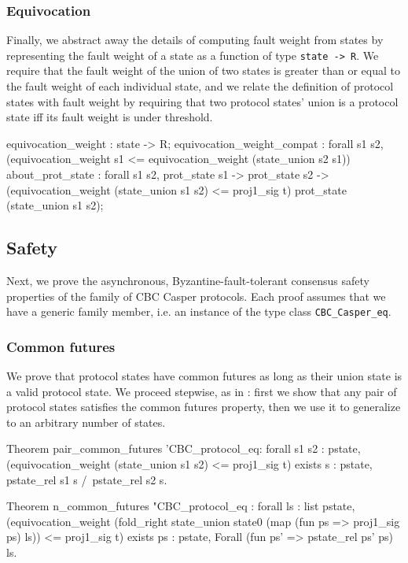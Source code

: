 \documentclass[runningheads]{llncs}
\begin{document}
\subsubsection{Equivocation} 
Finally, we abstract away the details of computing fault weight from states by representing the fault weight of a state as a function of type \verb|state -> R|. We require that the fault weight of the union of two states is greater than or equal to the fault weight of each individual state, and we relate the definition of protocol states with fault weight by requiring that two protocol states' union is a protocol state iff its fault weight is under threshold. 
\begin{coq}
	equivocation_weight : state -> R; 
	equivocation_weight_compat : forall s1 s2, 
	 (equivocation_weight s1 <= 
	 equivocation_weight (state_union s2 s1))%
	about_prot_state : forall s1 s2, 
									prot_state s1 -> prot_state s2 ->
									(equivocation_weight (state_union s1 s2) 
									<= proj1_sig t)%
									prot_state (state_union s1 s2);
\end{coq}

\subsection{Safety} 
Next, we prove the asynchronous, Byzantine-fault-tolerant consensus safety properties of the family of CBC Casper protocols. Each proof assumes that we have a generic family member, i.e. an instance of the type class \verb|CBC_Casper_eq|. 
\subsubsection{Common futures} 
We prove that protocol states have common futures as long as their union state is a valid protocol state. We proceed stepwise, as in \cite{CBCfull}: first we show that any pair of protocol states satisfies the common futures property, then we use it to generalize to an arbitrary number of states. 
\begin{coq}
Theorem pair_common_futures '{CBC_protocol_eq}:
	forall s1 s2 : pstate,
	(equivocation_weight (state_union s1 s2) <= proj1_sig t)%
	exists s : pstate, pstate_rel s1 s /\ pstate_rel s2 s.
	
Theorem n_common_futures "{CBC_protocol_eq} :
	forall ls : list pstate,
	(equivocation_weight (fold_right state_union state0 (map (fun ps => proj1_sig ps) ls)) 
	<= proj1_sig t)%
	exists ps : pstate, Forall (fun ps' => pstate_rel ps' ps) ls.
\end{coq}	
\end{document}
